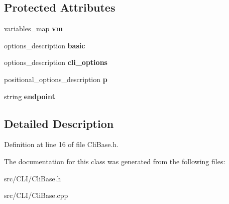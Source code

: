 \subsection*{Protected Attributes}
\begin{DoxyCompactItemize}
\item 
variables\_\-map {\bfseries vm}\label{classCliBase_a6f1a8ef69828b6effbd13b8f3dffd488}

\item 
options\_\-description {\bfseries basic}\label{classCliBase_a8adc76a9f4d22fabc4423b4ca23f4230}

\item 
options\_\-description {\bfseries cli\_\-options}\label{classCliBase_a9ff6498292f4a734e7a58f45bf32f2f1}

\item 
positional\_\-options\_\-description {\bfseries p}\label{classCliBase_a54f228b90881646fb8cfedd8c94837ba}

\item 
string {\bfseries endpoint}\label{classCliBase_a3aa9c753bf08040299e01d32f7c7094c}

\end{DoxyCompactItemize}


\subsection{Detailed Description}


Definition at line 16 of file CliBase.h.



The documentation for this class was generated from the following files:\begin{DoxyCompactItemize}
\item 
src/CLI/CliBase.h\item 
src/CLI/CliBase.cpp\end{DoxyCompactItemize}
